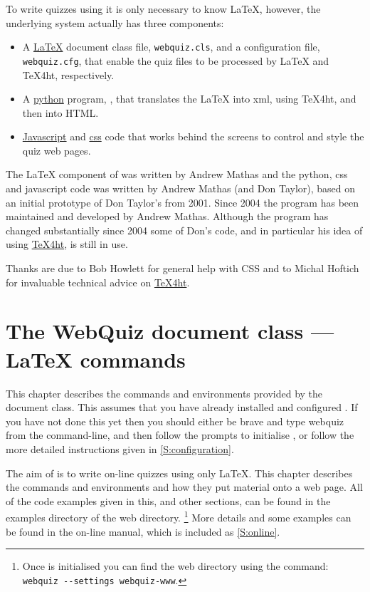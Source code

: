 \documentclass[svgnames]{article}
\newcommand\TeXfht{\href{https://www.ctan.org/tex4ht}{TeX4ht}\xspace}
\begin{document}
    To write quizzes using \WebQuiz it is only necessary to know
    \LaTeX, however, the underlying \WebQuiz system actually has three components:
    \begin{itemize}
      \item A \href{https://www.latex-project.org/}{\LaTeX} document class file, \texttt{webquiz.cls}, and
      a  configuration file, \texttt{webquiz.cfg}, that enable the
      quiz files to be processed by \LaTeX{} and \TeX 4ht, respectively.
      \item A \href{https://www.python.org/}{python} program, , that translates the
      \LaTeX{} into xml, using \TeX 4ht, and then into HTML.
      \item \href{https://www.w3schools.com/Js/}{Javascript} and \href{https://www.w3schools.com/css/}{css}
      code that works behind the screens to control and style the quiz web pages.
    \end{itemize}

   The \LaTeX{} component of \WebQuiz{} was written by Andrew Mathas
   and the python, css and javascript code was written by Andrew Mathas
   (and Don Taylor), based on an initial prototype of Don Taylor's from
   2001.  Since 2004 the program has been maintained and developed by
   Andrew Mathas. Although the program has changed substantially since
   2004 some of Don's code, and in particular his idea of using
   \TeXfht, is still in use.

   Thanks are due to Bob Howlett for general help with CSS and to
   Michal Hoftich for invaluable technical advice on \TeXfht.

 \section{The WebQuiz document class --- \LaTeX{} commands}
 \label{S:documentclass}

  This chapter describes the commands and environments provided by the
  \WebQuiz document class. This assumes that you have already installed
  and configured \WebQuiz. If you have not done this yet then you
  should either be brave and type \textsf{webquiz} from the
  command-line, and then follow the prompts to initialise \WebQuiz, or
  follow the more detailed instructions given in
  \autoref{S:configuration}.

  The aim of \WebQuiz is to write on-line quizzes using only \LaTeX.
  This chapter describes the \WebQuiz commands and environments and how
  they put material onto a web page.  All of the code examples given in
  this, and other sections, can be found in the \textsf{examples}
  directory of the \WebQuiz web directory.%
  \footnote{Once \WebQuiz is initialised you can find the \WebQuiz web
  directory using the command:\newline
  \hspace*{10mm}\lstinline[style=bashcode]|webquiz --settings webquiz-www|.}
  More details and some examples can be found in the on-line manual,
  which is included as \autoref{S:online}.
\end{document}
